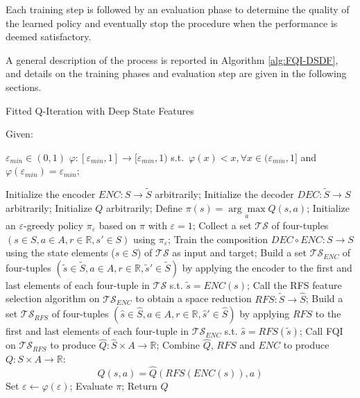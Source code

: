 Each training step is followed by an evaluation phase to determine the quality 
of the learned policy and eventually stop the procedure when the performance is 
deemed satisfactory.

A general description of the process is reported in Algorithm \ref{alg:FQI-DSDF},
and details on the training phases and evaluation step are given in the 
following sections. 
%
\begin{algorithm}
    \caption{Fitted Q-Iteration with Deep State Features}
    \label{alg:FQI-DSDF}
    \begin{algorithmic}
	\STATE Given: 
	    \begin{ALC@g}
	        \STATE $\varepsilon_{min} \in (0, 1)$
	        \STATE $\varphi: [\varepsilon_{min}, 1] \rightarrow [\varepsilon_{min}, 1)$ s.t.\ $\varphi(x) < x, \forall x \in (\varepsilon_{min}, 1]$ and $\varphi(\varepsilon_{min}) = \varepsilon_{min}$;
	    \end{ALC@g}
	\STATE Initialize the encoder $ENC: S \rightarrow \tilde{S}$ arbitrarily;
	\STATE Initialize the decoder $DEC: \tilde{S} \rightarrow S$ arbitrarily;
	\STATE Initialize $Q$ arbitrarily;
	\STATE Define $\pi(s) = \underset{a}{\arg\max} Q(s, a)$;
	\STATE Initialize an $\varepsilon$-greedy policy $\pi_\varepsilon$ based on $\pi$ with $\varepsilon = 1$;
	\REPEAT 
	    \STATE Collect a set $\mathcal{TS}$ of four-tuples $(s \in S, a \in A, r \in \mathbb{R}, s' \in S)$ using $\pi_\varepsilon$;
	    \STATE Train the composition $DEC \circ ENC: S \rightarrow S$ using the state elements ($s \in S$) of $\mathcal{TS}$ as input and target;
	    \STATE Build a set $\mathcal{TS}_{ENC}$ of four-tuples $(\tilde{s} \in \tilde{S}, a \in A, r \in \mathbb{R}, \tilde{s}' \in \tilde{S})$ by applying the encoder to the first and last elements of each four-tuple in $\mathcal{TS}$ s.t. $\tilde{s} = ENC(s)$;
	    \STATE Call the RFS feature selection algorithm on $\mathcal{TS}_{ENC}$ to obtain a space reduction $RFS: \tilde{S} \rightarrow \hat{S}$;
	    \STATE Build a set $\mathcal{TS}_{RFS}$ of four-tuples $(\hat{s} \in \hat{S}, a \in A, r \in \mathbb{R}, \hat{s}' \in \hat{S})$ by applying $RFS$ to the first and last elements of each four-tuple in $\mathcal{TS}_{ENC}$ s.t. $\hat{s} = RFS(\tilde{s})$;
	    \STATE Call FQI on $\mathcal{TS}_{RFS}$ to produce $\hat{Q}: \hat{S} \times A \rightarrow \mathbb{R}$;
	    \STATE Combine $\hat{Q}$, $RFS$ and $ENC$ to produce $Q: S \times A \rightarrow \mathbb{R}$:
		\[
		    Q(s, a) = \hat{Q}(RFS(ENC(s)), a)
		\]
	    \STATE Set $\varepsilon \leftarrow \varphi(\varepsilon)$;
	    \STATE Evaluate $\pi$; 
	\STATE Return $Q$
    \end{algorithmic}
\end{algorithm}
